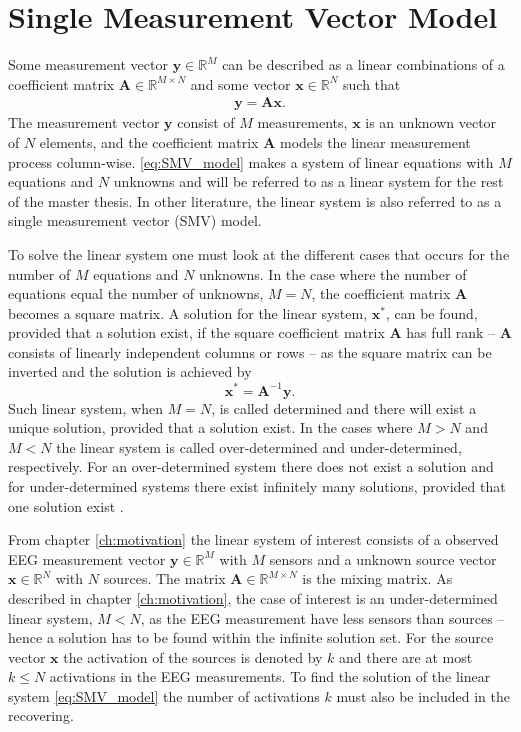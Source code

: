 \section{Single Measurement Vector Model}\label{sec:SMV}
Some measurement vector $\mathbf{y} \in \mathbb{R}^M$ can be described as a linear combinations of a coefficient matrix $\mathbf{A} \in \mathbb{R}^{M \times N}$ and some vector $\mathbf{x} \in \mathbb{R}^N$ such that
\begin{align}\label{eq:SMV_model}
\mathbf{y} = \mathbf{Ax}.
\end{align}
The measurement vector $\mathbf{y}$ consist of $M$ measurements, $\mathbf{x}$ is an unknown vector of $N$ elements, and the coefficient matrix $\mathbf{A}$ models the linear measurement process column-wise. 
\ref{eq:SMV_model} makes a system of linear equations with $M$ equations and $N$ unknowns and will be referred to as a linear system for the rest of the master thesis. In other literature, the linear system is also referred to as a single measurement vector (SMV) model.

To solve the linear system one must look at the different cases that occurs for the number of $M$ equations and $N$ unknowns.
In the case where the number of equations equal the number of unknowns, $M = N$, the coefficient matrix $\mathbf{A}$ becomes a square matrix. 
A solution for the linear system, $\mathbf{x}^\ast$, can be found, provided that a solution exist, if the square coefficient matrix $\mathbf{A}$ has full rank -- $\mathbf{A}$ consists of linearly independent columns or rows -- as the square matrix can be inverted and the solution is achieved by 
$$
\mathbf{x}^\ast = \mathbf{A}^{-1} \mathbf{y}.
$$
Such linear system, when $M = N$, is called determined and there will exist a unique solution, provided that a solution exist. 
In the cases where $M > N$ and $M < N$ the linear system is called over-determined and under-determined, respectively. 
For an over-determined system there does not exist a solution and for under-determined systems there exist infinitely many solutions, provided that one solution exist \cite[p. ix]{CS} .

From chapter \ref{ch:motivation} the linear system of interest consists of a observed EEG measurement vector $\mathbf{y} \in \mathbb{R}^M$ with $M$ sensors and a unknown source vector $\mathbf{x} \in \mathbb{R}^N$ with $N$ sources. 
The matrix $\mathbf{A} \in \mathbb{R}^{M \times N}$ is the mixing matrix.
As described in chapter \ref{ch:motivation}, the case of interest is an under-determined linear system, $M < N$, as the EEG measurement have less sensors than sources -- hence a solution has to be found within the infinite solution set. 
For the source vector $\mathbf{x}$ the activation of the sources is denoted by $k$ and there are at most $k \leq N$ activations in the EEG measurements. 
To find the solution of the linear system \eqref{eq:SMV_model} the number of activations $k$ must also be included in the recovering.

